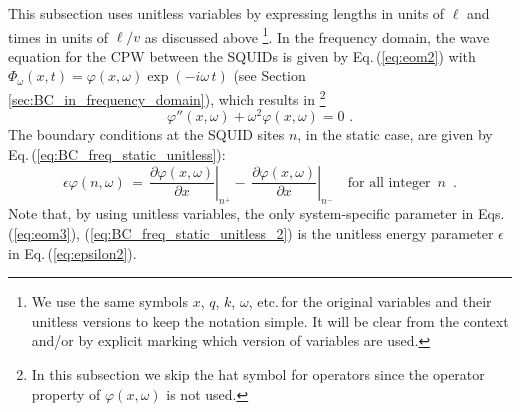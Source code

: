 \noindent
This subsection uses unitless variables
by expressing lengths in units of $\ell$ and times in units of $\ell/v$ as discussed above
\footnote{We use the same symbols $x$, $q$, $k$, $\omega$, etc.\,for the original variables 
and their unitless versions to keep the notation simple. It will be clear from 
the context and/or by explicit marking which version of variables are used.}.
%
In the frequency domain, the wave equation for the CPW between the SQUIDs is given by
Eq.\,(\ref{eq:eom2}) with 
$\Phi_{\omega}(x, t) = \varphi(x,\omega) \exp(- i \omega \, t)$ 
(see Section \ref{sec:BC_in_frequency_domain}), which results in
\footnote{In this subsection we skip the hat symbol for operators since the operator property 
of $\varphi(x,\omega)$ is not used.}
%
\begin{equation} \label{eq:eom3}
\varphi''(x,\omega) + \omega^2 \varphi(x,\omega) = 0 \, \, .
\end{equation}
% 
The boundary conditions at the SQUID sites $n$, in the static case, 
are given by Eq.\,(\ref{eq:BC_freq_static_unitless}):
%
\begin{equation}\label{eq:BC_freq_static_unitless_2}
\epsilon \varphi(n, \omega) \, = \, 
\left.\frac{\partial \varphi(x, \omega)}{\partial x}\right|_{n^{+}}
- \, \left.\frac{\partial \varphi(x,\omega)}{\partial x}\right|_{n^{-}} \quad \text{for all integer} \, \, \, n \, \, \, .
\end{equation}
%
Note that, by using unitless variables, the only system-specific parameter in 
Eqs.\,(\ref{eq:eom3}), (\ref{eq:BC_freq_static_unitless_2}) is the unitless energy parameter 
$\epsilon$ in Eq.\,(\ref{eq:epsilon2}). 

